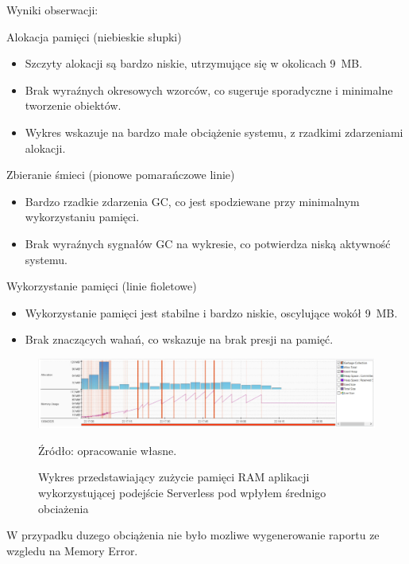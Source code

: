 \documentclass[runningheads,12pt]{llncs}
\begin{document}
Wyniki obserwacji:

Alokacja pamięci (niebieskie słupki)

\begin{itemize}
    \item Szczyty alokacji są bardzo niskie, utrzymujące się w okolicach 9~MB.
    \item Brak wyraźnych okresowych wzorców, co sugeruje sporadyczne i minimalne tworzenie obiektów.
    \item Wykres wskazuje na bardzo małe obciążenie systemu, z rzadkimi zdarzeniami alokacji.
\end{itemize}

Zbieranie śmieci (pionowe pomarańczowe linie)

\begin{itemize}
    \item Bardzo rzadkie zdarzenia GC, co jest spodziewane przy minimalnym wykorzystaniu pamięci.
    \item Brak wyraźnych sygnałów GC na wykresie, co potwierdza niską aktywność systemu.
\end{itemize}

Wykorzystanie pamięci (linie fioletowe)

\begin{itemize}
    \item Wykorzystanie pamięci jest stabilne i bardzo niskie, oscylujące wokół 9~MB.
    \item Brak znaczących wahań, co wskazuje na brak presji na pamięć.
\end{itemize}

\newpage

\begin{figure}
    \includegraphics[width=\linewidth]{images/serverless-memory-middle-graph.jpg}
    \caption{Wykres przedstawiający zużycie pamięci RAM aplikacji wykorzystującej podejście Serverless pod wpłyłem średnigo obciażenia} \label{fig1}
    \vspace{0.5em}
    {\small Źródło: opracowanie własne.}
\end{figure}

W przypadku duzego obciążenia nie było mozliwe wygenerowanie raportu ze wzgledu na Memory Error.
\end{document}
